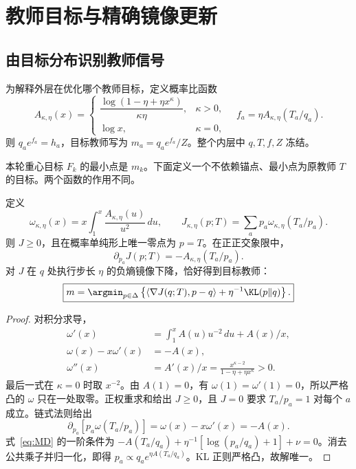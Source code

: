 \chapter{教师目标与精确镜像更新}
\label{ch:objective}
\section{由目标分布识别教师信号}
为解释外层在优化哪个教师目标，定义概率比函数
\begin{equation}
A_{\kappa,\eta}(x)=
\begin{cases}
\dfrac{\log(1-\eta+\eta x^\kappa)}{\kappa\eta},&\kappa>0,\\[1mm]
\log x,&\kappa=0,
\end{cases}
\quad f_a=\eta A_{\kappa,\eta}(T_a/q_a).
\label{eq:signal}
\end{equation}
则 $q_ae^{f_a}=h_a$，目标教师写为 $m_a=q_ae^{f_a}/Z$。整个内层中 $q,T,f,Z$ 冻结。

本轮重心目标 $F_k$ 的最小点是 $m_k$。下面定义一个不依赖锚点、最小点为原教师 $T$ 的目标。两个函数的作用不同。

\begin{theorem}[教师目标的构造与镜像解释]
\label{thm:J}
定义
\begin{equation}
\omega_{\kappa,\eta}(x)=x\int_1^x\frac{A_{\kappa,\eta}(u)}{u^2}\,du,
\qquad
J_{\kappa,\eta}(p;T)=\sum_ap_a\omega_{\kappa,\eta}(T_a/p_a).
\label{eq:J}
\end{equation}
则 $J\ge0$，且在概率单纯形上唯一零点为 $p=T$。在正正交象限中，
\begin{equation}
\partial_{p_a}J(p;T)=-A_{\kappa,\eta}(T_a/p_a).
\label{eq:J-gradient}
\end{equation}
对 $J$ 在 $q$ 处执行步长 $\eta$ 的负熵镜像下降，恰好得到目标教师：
\begin{equation}
\boxed{m=\argmin_{p\in\Delta}
\left\{\langle\nabla J(q;T),p-q\rangle+\eta^{-1}\KL(p\Vert q)\right\}.}
\label{eq:MD}
\end{equation}
\end{theorem}
\begin{proof}
对积分求导，
\begin{align}
\omega'(x)&=\int_1^x A(u)u^{-2}\,du+A(x)/x,\\
\omega(x)-x\omega'(x)&=-A(x),\\
\omega''(x)&=A'(x)/x
=\frac{x^{\kappa-2}}{1-\eta+\eta x^\kappa}>0.
\end{align}
最后一式在 $\kappa=0$ 时取 $x^{-2}$。由 $A(1)=0$，有 $\omega(1)=\omega'(1)=0$，所以严格凸的 $\omega$ 只在一处取零。正权重求和给出 $J\ge0$，且 $J=0$ 要求 $T_a/p_a=1$ 对每个 $a$ 成立。链式法则给出
\begin{equation}
\partial_{p_a}[p_a\omega(T_a/p_a)]
=\omega(x)-x\omega'(x)=-A(x).
\end{equation}
式~\eqref{eq:MD} 的一阶条件为 $-A(T_a/q_a)+\eta^{-1}[\log(p_a/q_a)+1]+\nu=0$。消去公共乘子并归一化，即得 $p_a\propto q_ae^{\eta A(T_a/q_a)}$。KL 正则严格凸，故解唯一。
\end{proof}

